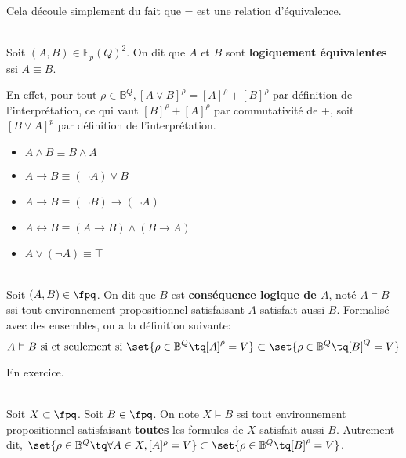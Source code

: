 \documentclass{scrartcl}
\begin{document}
			\begin{demo}
				\item Cela découle simplement du fait que = est une relation d'équivalence.
			\end{demo}
			~\\
			{\parindent0pt Soit $(A,B) \in \mathbb{F}_p(Q)^2$. On dit que $A$ et $B$ sont \textbf{logiquement équivalentes} ssi $A \equiv B$.}

			\begin{demo}
				\item En effet, pour tout $\rho \in \mathbb{B}^Q, [A\vee B]^\rho = [A]^\rho + [B]^\rho$ par définition de l'interprétation, 
				ce qui vaut $[B]^\rho + [A]^\rho$ par commutativité de +, soit $[B\vee A]^p$ par définition de l'interprétation.
			\end{demo}

			\begin{itemize}
				\item $A \wedge B \equiv B \wedge A$
				\item $A \rightarrow B \equiv (\neg A) \vee B$
				\item $A \rightarrow B \equiv (\neg B) \rightarrow (\neg A)$
				\item $A \leftrightarrow B \equiv (A \rightarrow B) \wedge (B \rightarrow A)$ 
				\item $A \vee (\neg A) \equiv \top$
			\end{itemize}
			
			~\\
			Soit $(A,B) \in \fpq$. On dit que $B$ est \textbf{conséquence logique de $A$}, noté $A \vDash B$ ssi tout environnement propositionnel satisfaisant $A$ satisfait aussi $B$.
			Formalisé avec des ensembles, on a la définition suivante:
			\[ A \vDash B \text{ si et seulement si } \set{\rho \in \mathbb{B}^Q \tq [A]^\rho = V} \subset \set{\rho \in \mathbb{B}^Q \tq [B]^Q = V} \]

			\begin{demo}
				\item En exercice.
			\end{demo}
			~\\
			Soit $X \subset \fpq$. Soit $B \in \fpq$.
			On note $X \vDash B$ ssi tout environnement propositionnel satisfaisant \textbf{toutes} les formules de $X$ satisfait aussi $B$.
			Autrement dit, $\set{\rho \in \mathbb{B}^Q \tq \forall A \in X , [A]^\rho = V} \subset \set{\rho \in \mathbb{B}^Q \tq [B]^\rho = V}$.
			
\end{document}
